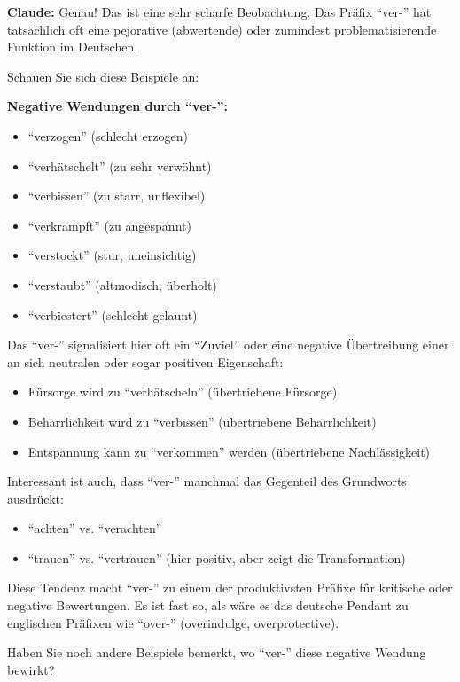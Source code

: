 \documentclass[11pt,a4paper]{scrartcl}
\begin{document}
\begin{claudebox}
\textbf{Claude:} Genau! Das ist eine sehr scharfe Beobachtung. Das Präfix "`ver-"' hat tatsächlich oft eine pejorative (abwertende) oder zumindest problematisierende Funktion im Deutschen.

Schauen Sie sich diese Beispiele an:

\textbf{Negative Wendungen durch "`ver-"':}
\begin{itemize}
\item "`verzogen"' (schlecht erzogen)
\item "`verhätschelt"' (zu sehr verwöhnt)
\item "`verbissen"' (zu starr, unflexibel)
\item "`verkrampft"' (zu angespannt)
\item "`verstockt"' (stur, uneinsichtig)
\item "`verstaubt"' (altmodisch, überholt)
\item "`verbiestert"' (schlecht gelaunt)
\end{itemize}

Das "`ver-"' signalisiert hier oft ein "`Zuviel"' oder eine negative Übertreibung einer an sich neutralen oder sogar positiven Eigenschaft:
\begin{itemize}
\item Fürsorge wird zu "`verhätscheln"' (übertriebene Fürsorge)
\item Beharrlichkeit wird zu "`verbissen"' (übertriebene Beharrlichkeit)
\item Entspannung kann zu "`verkommen"' werden (übertriebene Nachlässigkeit)
\end{itemize}

Interessant ist auch, dass "`ver-"' manchmal das Gegenteil des Grundworts ausdrückt:
\begin{itemize}
\item "`achten"' vs. "`verachten"'
\item "`trauen"' vs. "`vertrauen"' (hier positiv, aber zeigt die Transformation)
\end{itemize}

Diese Tendenz macht "`ver-"' zu einem der produktivsten Präfixe für kritische oder negative Bewertungen. Es ist fast so, als wäre es das deutsche Pendant zu englischen Präfixen wie "`over-"' (overindulge, overprotective).

Haben Sie noch andere Beispiele bemerkt, wo "`ver-"' diese negative Wendung bewirkt?
\end{claudebox}
\end{document}
